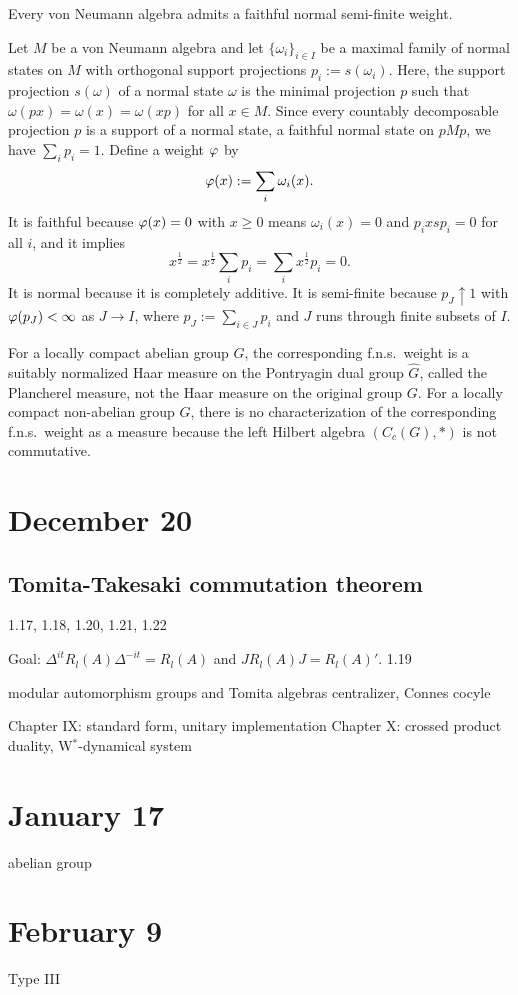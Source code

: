 \documentclass{../../small}
\begin{document}
\begin{prop}
Every von Neumann algebra admits a faithful normal semi-finite weight.
\end{prop}
\begin{pf}
Let $M$ be a von Neumann algebra and let $\{\omega_i\}_{i\in I}$ be a maximal family of normal states on $M$ with orthogonal support projections $p_i:=s(\omega_i)$.
Here, the support projection $s(\omega)$ of a normal state $\omega$ is the minimal projection $p$ such that $\omega(px)=\omega(x)=\omega(xp)$ for all $x\in M$.
Since every countably decomposable projection $p$ is a support of a normal state, a faithful normal state on $pMp$, we have $\sum_ip_i=1$.
Define a weight $\varphi$ by
\[\varphi(x):=\sum_i\omega_i(x).\]
It is faithful because $\varphi(x)=0$ with $x\ge0$ means $\omega_i(x)=0$ and $p_ixsp_i=0$ for all $i$, and it implies
\[x^{\frac12}=x^{\frac12}\sum_ip_i=\sum_ix^{\frac12}p_i=0.\]
It is normal because it is completely additive.
It is semi-finite because $p_J\uparrow1$ with $\varphi(p_J)<\infty$ as $J\to I$, where $p_J:=\sum_{i\in J}p_i$ and $J$ runs through finite subsets of $I$.
\end{pf}


\begin{ex}
For a locally compact abelian group $G$, the corresponding f.n.s.~weight is a suitably normalized Haar measure on the Pontryagin dual group $\hat G$, called the Plancherel measure, not the Haar measure on the original group $G$.
For a locally compact non-abelian group $G$, there is no characterization of the corresponding f.n.s.~weight as a measure because the left Hilbert algebra $(C_c(G),*)$ is not commutative.
\end{ex}







\newpage
\section{December 20}


\subsection{Tomita-Takesaki commutation theorem}
1.17, 1.18, 1.20, 1.21, 1.22

\begin{thm}
Goal: $\Delta^{it}R_l(A)\Delta^{-it}=R_l(A)$ and $JR_l(A)J=R_l(A)'$.
1.19
\end{thm}


modular automorphism groups and Tomita algebras
centralizer, Connes cocyle

Chapter IX: standard form, unitary implementation
Chapter X: crossed product duality, W$^*$-dynamical system



\newpage
\section{January 17}

abelian group

\newpage
\section{February 9}

Type III
\end{document}
